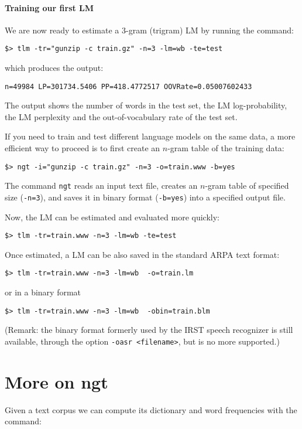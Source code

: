 \documentclass[11pt]{article}
\begin{document}
\paragraph{Training our first LM}
\noindent
We  are now ready to estimate a  3-gram (trigram)  LM by  running the command:

\begin{verbatim}
$> tlm -tr="gunzip -c train.gz" -n=3 -lm=wb -te=test
\end{verbatim}
\noindent
which produces the output:
\begin{verbatim}
n=49984 LP=301734.5406 PP=418.4772517 OOVRate=0.05007602433
\end{verbatim}
\noindent
The output shows the number of  words in the test set, the LM log-probability, the LM perplexity  
and the out-of-vocabulary rate  of the test set.

\noindent
If you need  to train and test different language  models on the same data, a  more efficient 
way to  proceed is to first  create an $n$-gram table of the training data:
\begin{verbatim}
$> ngt -i="gunzip -c train.gz" -n=3 -o=train.www -b=yes
\end{verbatim}
\noindent
The command {\tt ngt} reads an  input text file, creates an  $n$-gram table of specified size ({\tt -n=3}), and 
saves it in binary format ({\tt -b=yes}) into a specified output file.

\noindent
Now,  the  LM can  be  estimated and evaluated more quickly:
\begin{verbatim}
$> tlm -tr=train.www -n=3 -lm=wb -te=test
\end{verbatim}

\noindent
Once  estimated, a  LM can  be also saved in the standard ARPA text format:
\begin{verbatim}
$> tlm -tr=train.www -n=3 -lm=wb  -o=train.lm
\end{verbatim}
or in a binary format 
\begin{verbatim}
$> tlm -tr=train.www -n=3 -lm=wb  -obin=train.blm
\end{verbatim}

\noindent
(Remark: the  binary format formerly used by the IRST speech recognizer is still available, through the option
{\tt -oasr <filename>}, but is no more supported.)

\newpage
\section{More on ngt}
Given a text corpus we can compute its dictionary and word frequencies
with the command:
\end{document}

